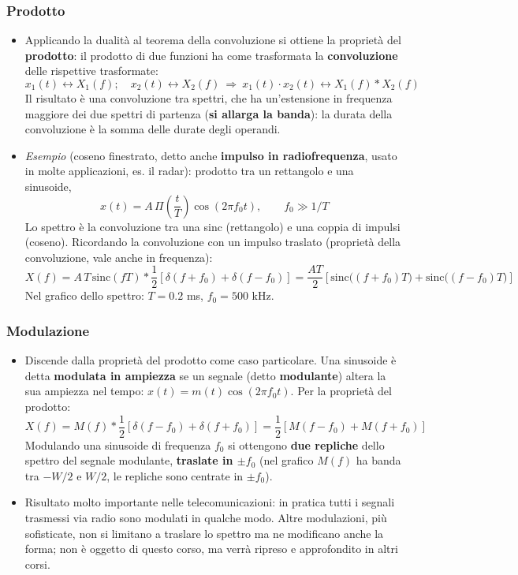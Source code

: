 \documentclass[12pt, a4paper]{article}
\begin{document}
\subsubsection{Prodotto}
\begin{itemize}
    \item Applicando la dualità al teorema della convoluzione si ottiene la proprietà del \textbf{prodotto}: il prodotto di due funzioni ha come trasformata la \textbf{convoluzione} delle rispettive trasformate:
    $$x_1(t)\longleftrightarrow X_1(f);\quad x_2(t)\longleftrightarrow X_2(f)\ \Longrightarrow\ x_1(t)\cdot x_2(t)\longleftrightarrow X_1(f)*X_2(f)$$
    Il risultato è una convoluzione tra spettri, che ha un'estensione in frequenza maggiore dei due spettri di partenza (\textbf{si allarga la banda}): la durata della convoluzione è la somma delle durate degli operandi.
    \item \textit{Esempio} (coseno finestrato, detto anche \textbf{impulso in radiofrequenza}, usato in molte applicazioni, es. il radar): prodotto tra un rettangolo e una sinusoide,
    $$x(t)=A\,\Pi\!\left(\frac tT\right)\cos(2\pi f_0t),\qquad f_0\gg1/T$$
    Lo spettro è la convoluzione tra una sinc (rettangolo) e una coppia di impulsi (coseno). Ricordando la convoluzione con un impulso traslato (proprietà della convoluzione, vale anche in frequenza):
    $$X(f)=A\,T\,\text{sinc}(fT)*\frac12\left[\delta(f+f_0)+\delta(f-f_0)\right]=\frac{AT}{2}\left[\text{sinc}\big((f+f_0)T\big)+\text{sinc}\big((f-f_0)T\big)\right]$$
    Nel grafico dello spettro: $T=0.2$ ms, $f_0=500$ kHz.
\end{itemize}

\subsubsection{Modulazione}
\begin{itemize}
    \item Discende dalla proprietà del prodotto come caso particolare. Una sinusoide è detta \textbf{modulata in ampiezza} se un segnale (detto \textbf{modulante}) altera la sua ampiezza nel tempo: $x(t)=m(t)\cos(2\pi f_0t)$. Per la proprietà del prodotto:
    $$X(f)=M(f)*\frac12\left[\delta(f-f_0)+\delta(f+f_0)\right]=\frac12\left[M(f-f_0)+M(f+f_0)\right]$$
    Modulando una sinusoide di frequenza $f_0$ si ottengono \textbf{due repliche} dello spettro del segnale modulante, \textbf{traslate in $\pm f_0$} (nel grafico $M(f)$ ha banda tra $-W/2$ e $W/2$, le repliche sono centrate in $\pm f_0$).
    \item Risultato molto importante nelle telecomunicazioni: in pratica tutti i segnali trasmessi via radio sono modulati in qualche modo. Altre modulazioni, più sofisticate, non si limitano a traslare lo spettro ma ne modificano anche la forma; non è oggetto di questo corso, ma verrà ripreso e approfondito in altri corsi.
\end{itemize}
\end{document}
